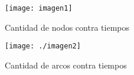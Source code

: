 \documentclass[a4paper, 11pt]{article}
\begin{document}
\begin{figure}[H]
\centering
\texttt{[image: imagen1]}
\caption{Cantidad de nodos contra tiempos} \label{figure11}
\end{figure}



\begin{figure}[H]
\centering
\texttt{[image: ./imagen2]}
\caption{Cantidad de arcos contra tiempos} \label{figure12}
\end{figure}








\nocite{*}
\end{document}
